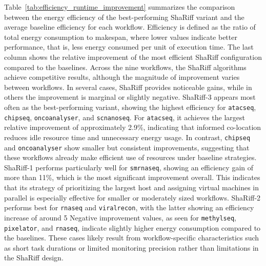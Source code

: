 Table~\ref{tab:efficiency_runtime_improvement} summarizes the comparison between the energy efficiency of the best-performing ShaRiff variant and the average baseline efficiency for each workflow. Efficiency is defined as the ratio of total energy consumption to makespan, where lower values indicate better performance, that is, less energy consumed per unit of execution time. The last column shows the relative improvement of the most efficient ShaRiff configuration compared to the baselines.
Across the nine workflows, the ShaRiff algorithms achieve competitive results, although the magnitude of improvement varies between workflows. In several cases, ShaRiff provides noticeable gains, while in others the improvement is marginal or slightly negative. ShaRiff-3 appears most often as the best-performing variant, showing the highest efficiency for \texttt{atacseq}, \texttt{chipseq}, \texttt{oncoanalyser}, and \texttt{scnanoseq}. For \texttt{atacseq}, it achieves the largest relative improvement of approximately 2.9\%, indicating that informed co-location reduces idle resource time and unnecessary energy usage. In contrast, \texttt{chipseq} and \texttt{oncoanalyser} show smaller but consistent improvements, suggesting that these workflows already make efficient use of resources under baseline strategies.
ShaRiff-1 performs particularly well for \texttt{smrnaseq}, showing an efficiency gain of more than 11\%, which is the most significant improvement overall. This indicates that its strategy of prioritizing the largest host and assigning virtual machines in parallel is especially effective for smaller or moderately sized workflows. ShaRiff-2 performs best for \texttt{rnaseq} and \texttt{viralrecon}, with the latter showing an efficiency increase of around 5%
Negative improvement values, as seen for \texttt{methylseq}, \texttt{pixelator}, and \texttt{rnaseq}, indicate slightly higher energy consumption compared to the baselines. These cases likely result from workflow-specific characteristics such as short task durations or limited monitoring precision rather than limitations in the ShaRiff design.

